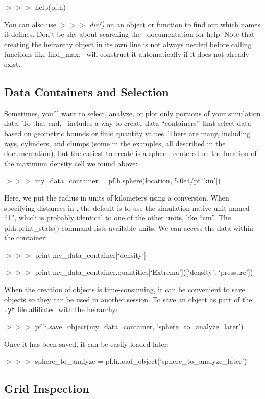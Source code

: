 {\scriptsize$>>>$} help(pf.h)

You can also use {\scriptsize$>>>$} {\it dir()} on an object or
function to find out which names it defines. Don't be shy about
searching the \yt\ documentation for help. Note that creating the
heirarchy object in its own line is not always needed before calling
functions like find\_max; \yt\ will construct it automatically if it
does not already exist.

\subsection{Data Containers and Selection}

Sometimes, you'll want to select, analyze, or plot only portions of
your simulation data. To that end, \yt\ includes a way to create data
``containers'' that select data based on geometric bounds or fluid
quantity values. There are many, including rays, cylinders, and clumps
(some in the examples, all described in the documentation), but the
easiest to create is a sphere, centered on the location of the maximum
density cell we found above:

{\scriptsize$>>>$} my\_data\_container = pf.h.sphere(location, 5.0e4/pf[`km'])

Here, we put the radius in units of kilometers using a
conversion. When specifying distances in \yt, the default is to use the
simulation-native unit named ``1'', which is probably identical to one
of the other units, like ``cm''. The pf.h.print\_stats() command lists
available units. We can access the data within the container:

{\scriptsize$>>>$} print my\_data\_container[`density']

{\scriptsize$>>>$} print my\_data\_container.quantities[`Extrema']([`density', `pressure'])

When the creation of objects is time-consuming, it can be convenient
to save objects so they can be used in another session. To save an
object as part of the {\tt .yt} file affiliated with the heirarchy:

{\scriptsize$>>>$} pf.h.save\_object(my\_data\_container, `sphere\_to\_analyze\_later')

Once it has been saved, it can be easily loaded later:

{\scriptsize$>>>$} sphere\_to\_analyze = pf.h.load\_object(`sphere\_to\_analyze\_later')

\subsection{Grid Inspection}

